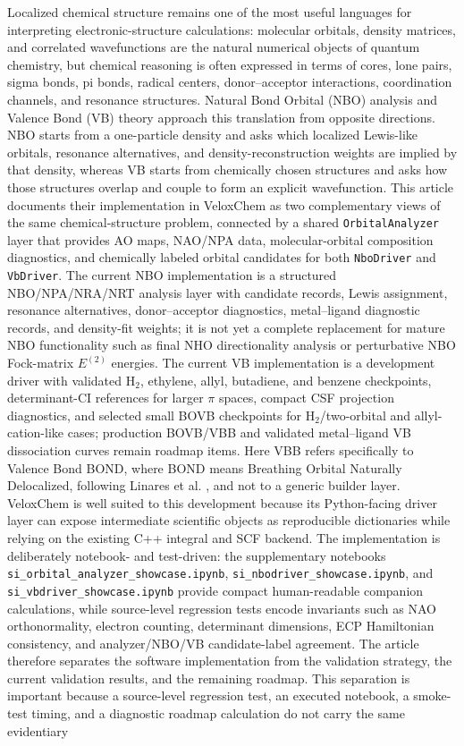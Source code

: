 \documentclass[11pt]{article}
\begin{document}
Localized chemical structure remains one of the most useful languages for interpreting electronic-structure calculations: molecular orbitals, density matrices, and correlated wavefunctions are the natural numerical objects of quantum chemistry, but chemical reasoning is often expressed in terms of cores, lone pairs, sigma bonds, pi bonds, radical centers, donor--acceptor interactions, coordination channels, and resonance structures.  Natural Bond Orbital (NBO) analysis \cite{FosterWeinhold1980,ReedCurtissWeinhold1988,NBOProgram} and Valence Bond (VB) theory \cite{ShaikHibertyVB} approach this translation from opposite directions.  NBO starts from a one-particle density and asks which localized Lewis-like orbitals, resonance alternatives, and density-reconstruction weights are implied by that density, whereas VB starts from chemically chosen structures and asks how those structures overlap and couple to form an explicit wavefunction.  This article documents their implementation in VeloxChem \cite{VeloxChem} as two complementary views of the same chemical-structure problem, connected by a shared \texttt{OrbitalAnalyzer} layer that provides AO maps, NAO/NPA data, molecular-orbital composition diagnostics, and chemically labeled orbital candidates for both \texttt{NboDriver} and \texttt{VbDriver}.  The current NBO implementation is a structured NBO/NPA/NRA/NRT analysis layer with candidate records, Lewis assignment, resonance alternatives, donor--acceptor diagnostics, metal--ligand diagnostic records, and density-fit weights; it is not yet a complete replacement for mature NBO functionality such as final NHO directionality analysis or perturbative NBO Fock-matrix $E^{(2)}$ energies.  The current VB implementation is a development driver with validated H$_2$, ethylene, allyl, butadiene, and benzene checkpoints, determinant-CI references for larger $\pi$ spaces, compact CSF projection diagnostics, and selected small BOVB checkpoints \cite{BOVB} for H$_2$/two-orbital and allyl-cation-like cases; production BOVB/VBB and validated metal--ligand VB dissociation curves remain roadmap items.  Here VBB refers specifically to Valence Bond BOND, where BOND means Breathing Orbital Naturally Delocalized, following Linares et al. \cite{LinaresVBB}, and not to a generic builder layer.  VeloxChem is well suited to this development because its Python-facing driver layer can expose intermediate scientific objects as reproducible dictionaries while relying on the existing C++ integral and SCF backend.  The implementation is deliberately notebook- and test-driven: the supplementary notebooks \texttt{si\_orbital\_analyzer\_showcase.ipynb}, \texttt{si\_nbodriver\_showcase.ipynb}, and \texttt{si\_vbdriver\_showcase.ipynb} provide compact human-readable companion calculations, while source-level regression tests encode invariants such as NAO orthonormality, electron counting, determinant dimensions, ECP Hamiltonian consistency, and analyzer/NBO/VB candidate-label agreement.  The article therefore separates the software implementation from the validation strategy, the current validation results, and the remaining roadmap.  This separation is important because a source-level regression test, an executed notebook, a smoke-test timing, and a diagnostic roadmap calculation do not carry the same evidentiary 
\end{document}

